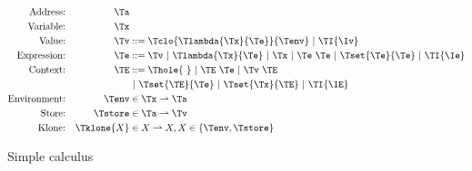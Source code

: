 \begin{figure}[h]
\begin{align*}
\textrm{Address:}     && \Ta          & \\
\textrm{Variable:}    && \Tx          & \\
\textrm{Value:}       && \Tv          & ::=  \Tclo{\Tlambda{\Tx}{\Te}}{\Tenv}
                                        \ |\ \TI{\Iv}\\
\textrm{Expression:}  && \Te          & ::=  \Tv
                                        \ |\ \Tlambda{\Tx}{\Te}
                                        \ |\ \Tx
                                        \ |\ \Te\ \Te
                                        \ |\ \Tset{\Te}{\Te}
                                        \ |\ \TI{\Ie}\\
\textrm{Context:}     && \TE          & ::=  \Thole{\ }
                                        \ |\ \TE\ \Te
                                        \ |\ \Tv\ \TE\\&&&
                                        \ |\ \Tset{\TE}{\Te}
                                        \ |\ \Tset{\Tx}{\TE}
                                        \ |\ \TI{\IE}\\
\textrm{Environment:} && \Tenv        & \in \Tx \rightharpoonup \Ta \\
\textrm{Store:}       && \Tstore      & \in \Ta \rightharpoonup \Tv \\
\textrm{Klone:}       && \Tklone{X}   & \in X \rightharpoonup X, X \in \{\Tenv, \Tstore \} \\
\end{align*}
\caption{Simple calculus}
\end{figure}

